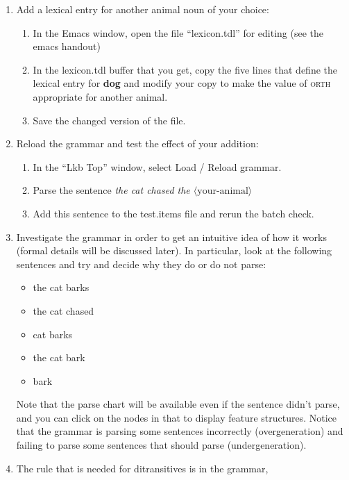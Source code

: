 \documentclass[10pt]{article}
\begin{document}
\begin{enumerate}
\begin{enumerate}
{\tt *common-lisp*} emacs buffer when it starts, and will print the message \texttt{Finished test
file} when it is done.
\item Open the file ``test.results'' from emacs
and inspect the parsing results.
\end{enumerate}
\item Add a lexical entry for another animal noun of your choice:
\begin{enumerate}
\item In the Emacs window, open the file ``lexicon.tdl'' for editing
(see the emacs handout)
\item In the lexicon.tdl buffer that you get, copy the five lines that
define the lexical entry for \textbf{dog} and modify your copy to make the
value of \textsc{orth} appropriate for another animal.
\item Save the changed version of the file.
\end{enumerate}
\item Reload the grammar and test the effect of your addition:
\begin{enumerate}
\item In the ``Lkb Top'' window, select \textsf{Load / Reload
grammar}.
\item Parse the sentence {\it the cat chased the
$\langle\mbox{your-animal}\rangle$}
\item Add this sentence to the test.items file and rerun the batch
check.
\end{enumerate}
\item Investigate the grammar in order to get an intuitive idea 
of how it works (formal details
will be discussed later).  In particular, look at the following sentences and 
try and decide why they do or do not parse:
\begin{itemize}
\item the cat barks
\item the cat chased
\item cat barks
\item the cat bark
\item bark
\end{itemize}
Note that the parse chart will be available even if the sentence didn't parse,
and you can click on the nodes in that to display feature structures.
Notice that the grammar is parsing some sentences incorrectly
(overgeneration)
and failing to parse some sentences that should parse (undergeneration).
\item The rule that is needed for ditransitives is in the grammar,

\end{enumerate}
\end{document}
